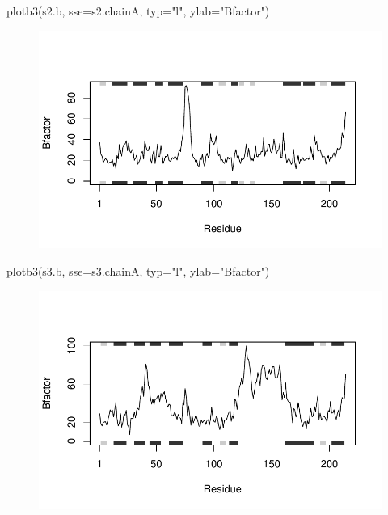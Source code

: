 \documentclass[
  letterpaper,
  DIV=11,
  numbers=noendperiod]{scrartcl}
\newenvironment{Shaded}{\begin{snugshade}}{\end{snugshade}}
\newcommand{\AttributeTok}[1]{\textcolor[rgb]{0.40,0.45,0.13}{#1}}
\newcommand{\FunctionTok}[1]{\textcolor[rgb]{0.28,0.35,0.67}{#1}}
\newcommand{\NormalTok}[1]{\textcolor[rgb]{0.00,0.23,0.31}{#1}}
\newcommand{\StringTok}[1]{\textcolor[rgb]{0.13,0.47,0.30}{#1}}
\begin{document}
\begin{Shaded}
\begin{Highlighting}[]
\FunctionTok{plotb3}\NormalTok{(s2.b, }\AttributeTok{sse=}\NormalTok{s2.chainA, }\AttributeTok{typ=}\StringTok{"l"}\NormalTok{, }\AttributeTok{ylab=}\StringTok{"Bfactor"}\NormalTok{)}
\end{Highlighting}
\end{Shaded}

\begin{figure}[H]

{\centering \includegraphics{hw6_turnin_files/figure-pdf/unnamed-chunk-6-2.pdf}

}

\end{figure}

\begin{Shaded}
\begin{Highlighting}[]
\FunctionTok{plotb3}\NormalTok{(s3.b, }\AttributeTok{sse=}\NormalTok{s3.chainA, }\AttributeTok{typ=}\StringTok{"l"}\NormalTok{, }\AttributeTok{ylab=}\StringTok{"Bfactor"}\NormalTok{) }
\end{Highlighting}
\end{Shaded}

\begin{figure}[H]

{\centering \includegraphics{hw6_turnin_files/figure-pdf/unnamed-chunk-6-3.pdf}

}

\end{figure}
\end{document}
